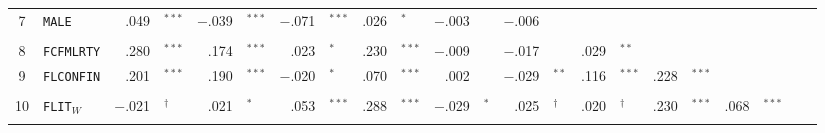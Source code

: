 {\begin{tabular}{cl r@{\hskip -0.1mm}l r@{\hskip -0.1mm}l r@{\hskip -0.1mm}l r@{\hskip -0.1mm}l r@{\hskip -0.1mm}l r@{\hskip -0.1mm}l r@{\hskip -0.1mm}l r@{\hskip -0.1mm}l r@{\hskip -0.1mm}l r@{\hskip -0.1mm}l}
            7     & \texttt{MALE}  & \cellcolor[rgb]{ .953,  .953,  1}.049 & $^{***}$ & \cellcolor[rgb]{ 1,  .961,  .961}$-.$039 & $^{***}$ & \cellcolor[rgb]{ 1,  .925,  .925}$-.$071 & $^{***}$ & \cellcolor[rgb]{ .976,  .976,  1}.026 & $^*$ & \cellcolor[rgb]{ 1,  .996,  .996}$-.$003 &       & \cellcolor[rgb]{ 1,  .992,  .992}$-.$006 &       &       &       &       &       &       &       &       &  \\
                  &       &       &       &       &       &       &       &       &       &       &       &       &       &       &       &       &       &       &       &       &  \\
            8     & \texttt{FCFMLRTY} & \cellcolor[rgb]{ .722,  .722,  1}.280 & $^{***}$ & \cellcolor[rgb]{ .827,  .827,  1}.174 & $^{***}$ & \cellcolor[rgb]{ .98,  .98,  1}.023 & $^*$ & \cellcolor[rgb]{ .773,  .773,  1}.230 & $^{***}$ & \cellcolor[rgb]{ 1,  .988,  .988}$-.$009 &       & \cellcolor[rgb]{ 1,  .98,  .98}$-.$017 &       & \cellcolor[rgb]{ .973,  .973,  1}.029 & $^{**}$ &       &       &       &       &       &  \\
            9     & \texttt{FLCONFIN} & \cellcolor[rgb]{ .8,  .8,  1}.201 & $^{***}$ & \cellcolor[rgb]{ .812,  .812,  1}.190 & $^{***}$ & \cellcolor[rgb]{ 1,  .976,  .976}$-.$020 & $^*$ & \cellcolor[rgb]{ .933,  .933,  1}.070 & $^{***}$ & .002 &       & \cellcolor[rgb]{ 1,  .969,  .969}$-.$029 & $^{**}$ & \cellcolor[rgb]{ .886,  .886,  1}.116 & $^{***}$ & \cellcolor[rgb]{ .773,  .773,  1}.228 & $^{***}$ &       &       &       &  \\
                  &       &       &       &       &       &       &       &       &       &       &       &       &       &       &       &       &       &       &       &       &  \\
            10    & \texttt{FLIT}$_W$  & \cellcolor[rgb]{ 1,  .976,  .976}$-.$021 & $^\dagger$ & \cellcolor[rgb]{ .98,  .98,  1}.021 & $^*$ & \cellcolor[rgb]{ .949,  .949,  1}.053 & $^{***}$ & \cellcolor[rgb]{ .714,  .714,  1}.288 & $^{***}$ & \cellcolor[rgb]{ 1,  .969,  .969}$-.$029 & $^*$ & \cellcolor[rgb]{ .976,  .976,  1}.025 & $^\dagger$ & \cellcolor[rgb]{ .98,  .98,  1}.020 & $^\dagger$ & \cellcolor[rgb]{ .773,  .773,  1}.230 & $^{***}$ & \cellcolor[rgb]{ .933,  .933,  1}.068 & $^{***}$ &       &  \\
            \bottomrule
                  &       &       &       &       &       &       &       &       &       &       &       &       &       &       &       &       &       &       &       &       &  \\

\end{tabular}}
